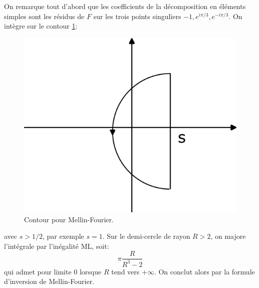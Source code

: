 \documentclass[a4paper, 12pt]{amsart}
\begin{document}
On remarque tout d'abord que les coefficients de la décomposition en éléments simples sont les résidus de $F$ sur les trois points singuliers $-1,e^{i \pi/3},e^{-i \pi /3}.$ On intègre sur le contour \ref{fig:contour_laplace}:
\begin{figure}
    \centering
    \includegraphics{images/contour_laplace.png}
    \caption{Contour pour Mellin-Fourier.}
    \label{fig:contour_laplace}
\end{figure}
avec $s > 1/2$, par exemple $s=1.$
Sur le demi-cercle de rayon $R > 2$, on majore l'intégrale par l'inégalité ML, soit:
\[
\pi \frac{R}{R^3-2} 
\]
qui admet pour limite $0$ lorsque $R$ tend vers $+\infty$.
On conclut alors par la formule d'inversion de Mellin-Fourier.
\end{document}
